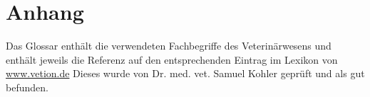 

\chapter{Anhang}


	
		
\label{Glossar}

Das Glossar enthält die verwendeten Fachbegriffe des Veterinärwesens und enthält jeweils die Referenz auf den entsprechenden Eintrag im Lexikon von \url{www.vetion.de} Dieses wurde von Dr. med. vet. Samuel Kohler geprüft und als gut befunden. 
\glsaddall
\printglossary

	

